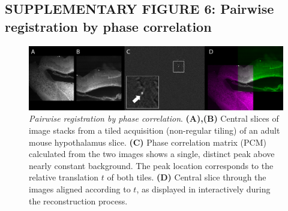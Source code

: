 \documentclass[]{spie}  %
\begin{document}
\subsection*{SUPPLEMENTARY FIGURE 6: Pairwise registration by phase correlation}
\vspace{1mm}
\begin{figure}[h!]
\includegraphics[width=\textwidth]{fig-stitching.png}
\vspace{-2.0mm}
\caption{\hspace{-0.5mm} \emph{Pairwise registration by phase correlation}. \textbf{(A),(B)} Central slices of image stacks from a tiled acquisition (non-regular tiling) of an adult mouse hypothalamus slice. \textbf{(C)} Phase correlation matrix (PCM) calculated from the two images shows a single, distinct peak above nearly constant background. The peak location corresponds to the relative translation $t$ of both tiles. \textbf{(D)} Central slice through the images aligned according to $t$, as displayed in interactively during the reconstruction process. 
}
\label{fig:sup-fig-stitching}
\end{figure}
\end{document}
